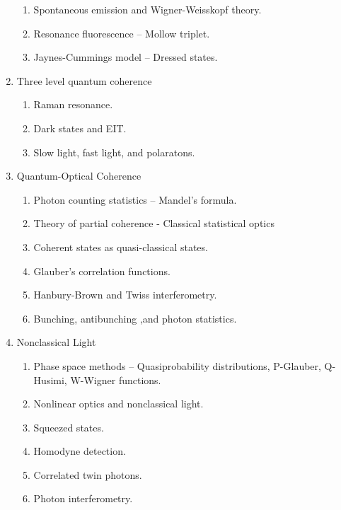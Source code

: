 \documentclass[letterpaper,10pt,english]{sphinxmanual}
\begin{document}
\begin{enumerate}
\begin{enumerate}
\item {} 
Spontaneous emission and Wigner-Weisskopf theory.

\item {} 
Resonance fluorescence -- Mollow triplet.

\item {} 
Jaynes-Cummings model -- Dressed states.

\end{enumerate}

\item {} 
Three level quantum coherence
\begin{enumerate}
\item {} 
Raman resonance.

\item {} 
Dark states and EIT.

\item {} 
Slow light, fast light, and polaratons.

\end{enumerate}

\item {} 
Quantum-Optical Coherence
\begin{enumerate}
\item {} 
Photon counting statistics -- Mandel's formula.

\item {} 
Theory of partial coherence - Classical statistical optics

\item {} 
Coherent states as quasi-classical states.

\item {} 
Glauber's correlation functions.

\item {} 
Hanbury-Brown and Twiss interferometry.

\item {} 
Bunching, antibunching ,and photon statistics.

\end{enumerate}

\item {} 
Nonclassical Light
\begin{enumerate}
\item {} 
Phase space methods -- Quasiprobability distributions, P-Glauber, Q-Husimi, W-Wigner functions.

\item {} 
Nonlinear optics and nonclassical light.

\item {} 
Squeezed states.

\item {} 
Homodyne detection.

\item {} 
Correlated twin photons.

\item {} 
Photon interferometry.

\end{enumerate}

\end{enumerate}
\end{document}
